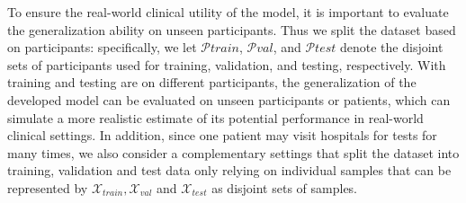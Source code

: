 To ensure the real-world clinical utility of the model, it is important to evaluate the generalization ability on unseen participants. Thus we split the dataset based on participants: specifically, we let $\mathcal{P}{{train}}$, $\mathcal{P}{{val}}$, and $\mathcal{P}{{test}}$ denote the disjoint sets of participants used for training, validation, and testing, respectively. With training and testing are on different participants, the generalization of the developed model can be evaluated on unseen participants or patients, which can simulate a more realistic estimate of its potential performance in real-world clinical settings. 
In addition, since one patient may visit hospitals for tests for many times, we also consider a complementary settings that split the dataset into training, validation and test data only relying on individual samples that can be represented by $\mathcal{X}_{train}, \mathcal{X}_{val}$ and $\mathcal{X}_{test}$ as disjoint sets of samples.






